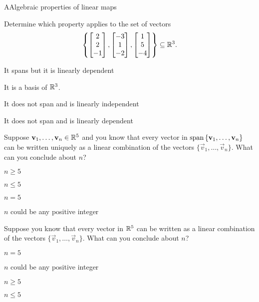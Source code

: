 \documentclass{article}[12pt]
\begin{document}
\begin{module}{A}{Algebraic properties of linear maps}
\begin{readinessAssuranceTest}
  \item Determine which property applies to the set of vectors $$\left\{ \begin{bmatrix}  2 \\ 2 \\ -1 \end{bmatrix}, \begin{bmatrix} -3 \\ 1 \\ -2 \end{bmatrix} , \begin{bmatrix} 1 \\ 5 \\ -4 \end{bmatrix}\right\}\subseteq \IR^3.$$
  \begin{readinessAssuranceTestChoices}
  \item It spans but it is linearly dependent
  \item It is a basis of $\IR^3$.
  \item It does not span and is linearly independent
  \item It does not span and is linearly dependent %
  \end{readinessAssuranceTestChoices}


  \item Suppose $\vec{v}_1, \ldots, \vec{v}_n \in \IR^5$ and you know that every vector in ${\rm span} \left\{ \vec{v}_1, \ldots, \vec{v}_n\right\}$ can be written uniquely as a linear combination of the vectors $\{\vec{v}_1, \ldots, \vec{v}_n\}$.  What can you conclude about $n$?
  \begin{readinessAssuranceTestChoices}
  \item $n \geq 5$
  \item $n \leq 5$
  \item $n=5$
  \item $n$ could be any positive integer
  \end{readinessAssuranceTestChoices}

  \item Suppose you know that every vector in $\IR^5$ can be written as a linear combination of the vectors $\{\vec{v}_1, \ldots, \vec{v}_n\}$.  What can you conclude about $n$?
  \begin{readinessAssuranceTestChoices}
  \item $n=5$
  \item $n$ could be any positive integer
  \item $n \geq 5$
  \item $n \leq 5$
  \end{readinessAssuranceTestChoices}


\end{readinessAssuranceTest}
\end{module}
\end{document}
